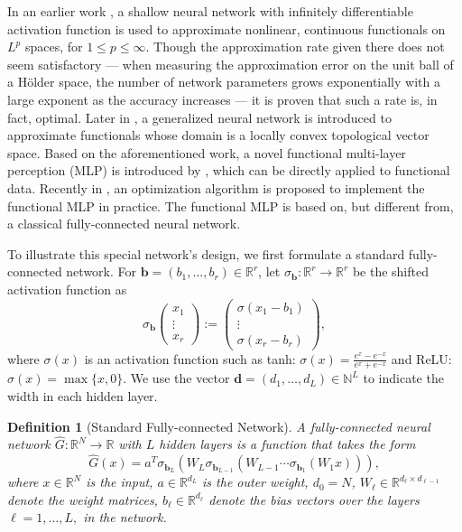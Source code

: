 \documentclass{article}
\def\NN{\mathbb N}
\def\RR{\mathbb R}
\numberwithin{equation}{section}
\newtheorem{definition}[theorem]{Definition}
\begin{document}
In an earlier work \citep{mhaskar1997neural}, a shallow neural network with infinitely differentiable activation function is used to approximate nonlinear, continuous functionals on $L^p$ spaces, for $1 \leq p \leq \infty$. 
Though the approximation rate given there does not seem satisfactory --- when measuring the approximation error on the unit ball of a H\"{o}lder space, the number of network parameters grows exponentially
with a large exponent as the accuracy increases --- it is proven that such a rate is, in fact, optimal.
Later in \citep{stinchcombe1999neural}, a generalized neural network is introduced to approximate functionals whose domain is a locally convex topological vector space.   
Based on the aforementioned work, a novel functional multi-layer perception (MLP) is introduced by \citep{rossi2005functional}, which can be directly applied to functional data. Recently in \citep{thind2023deep}, an optimization algorithm is proposed to implement the functional MLP in practice.
The functional MLP is based on, but different from, a classical fully-connected neural network. 

To illustrate this special network's design, we first formulate a standard fully-connected network. 
For $\mathbf b= (b_1,\ldots, b_r)\in \RR^r$, let $\sigma_{\mathbf b}: \RR^r \rightarrow \RR^r$ be the shifted activation function as 
\begin{equation*}
    \sigma_{\mathbf b}\begin{pmatrix}
    x_1\\
    \vdots\\
    x_r
    \end{pmatrix}:= \begin{pmatrix}
    \sigma (x_1-b_1)\\
    \vdots\\
    \sigma (x_r-b_r)
    \end{pmatrix},
\end{equation*}
where $\sigma(x)$ is an activation function such as tanh: $\sigma(x) = \frac{e^x- e^{-x}}{e^x+e^{-x}}$ and ReLU: $\sigma(x) = \max \{x,0\}$. 
We use the vector $\mathbf d= (d_1,\ldots, d_L)\in \NN^L$ to indicate the width in each hidden layer.  
\begin{definition}[Standard Fully-connected Network]\label{def:classic}
A fully-connected neural network $\widehat{G} : \RR^{N} \rightarrow \RR$ with $L$ hidden layers is a function that takes the form
\begin{equation*}
    \widehat{G}(x) = a^T\sigma_{\mathbf b_L}(W_L \sigma_{\mathbf b_{L-1}}(W_{L-1}\cdots  \sigma_{\mathbf b_1}(W_1 x))),
\end{equation*}
where $x \in \RR^{N}$ is the input, $a\in \RR^{d_L}$ is the outer weight, $d_0 = N$, $W_\ell \in \RR^{d_\ell \times d_{\ell-1}}$ denote the weight matrices, $b_\ell \in \RR^{d_\ell}$ denote the bias vectors over the layers $\ell =1,\ldots, L,$ in the network.
\end{definition}
\end{document}
